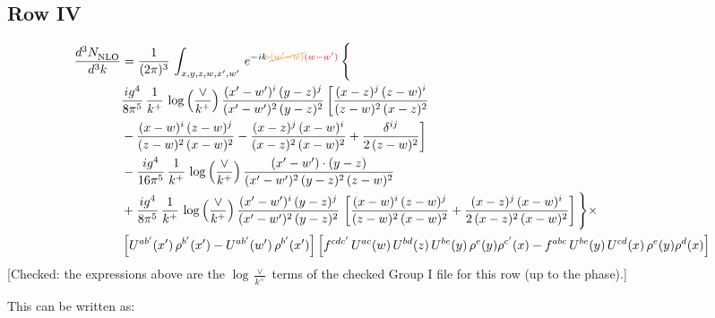 \documentclass[9pt]{article}
\numberwithin{equation}{section}
\begin{document}
\subsection{Row IV}
\begin{align}
    \frac{d^{3}N_{\rm NLO}^{\rm}}{d^{3}k}  & =   \frac{1}{(2\pi)^{3}}\,
    \int_{x,y,z,w,x',w'}\,e^{-ik\cdot {\color{orange}\cancel{(w^\prime-w)}}{\color{red}(w-w^\prime)}}\,\Bigg\{\notag \\
& \frac{ig^{4}}{8\pi^{5}}\,\frac{1}{k^{+}}\,\log{\left(\frac{\vee}{k^{+}}\right)}\,\frac{(x'-w')^{i}\,(y-z)^{j}}{(x'-w')^{2}\,(y-z)^{2}}\,\bigg[\frac{(x-z)^{j}\,(z-w)^{i}}{(z-w)^{2}\,(x-z)^{2}}\notag \\ & -\frac{(x-w)^{i}\,(z-w)^{j}}{(z-w)^{2}\,(x-w)^{2}}-\frac{(x-z)^{j}\,(x-w)^{i}}{(x-z)^{2}\,(x-w)^{2}}+\frac{\delta^{ij}}{2\,(z-w)^{2}}\bigg] \notag \\
& -\frac{ig^{4}}{16\pi^{5}}\,\frac{1}{k^{+}}\,\log{\left(\frac{\vee}{k^{+}}\right)} \,\frac{(x'-w')\cdot (y-z)}{(x'-w')^{2}\,(y-z)^{2}\,(z-w)^{2}}\notag \\
& + \frac{ig^{4}}{8\pi^{5}}\,\frac{1}{k^{+}}\,\log{\left(\frac{\vee}{k^{+}}\right)}\,\frac{(x'-w')^{i}\,(y-z)^{j}}{(x'-w')^{2}\,(y-z)^{2}}\,\left[\frac{(x-w)^{i}\,(z-w)^{j}}{(z-w)^{2}\,(x-w)^{2}}+\frac{(x-z)^{j}\,(x-w)^{i}}{2\, (x-z)^{2}\,(x-w)^{2}}\right]\Bigg\}\times\notag \\ &  \left[U^{ab'}(x')\,\rho^{b'}(x')-U^{ab'}(w')\,\rho^{b'}(x')\right] \left[f^{cdc'}\,U^{ac}(w)\,U^{bd}(z)\,U^{be}(y)\,\rho^{e}(y)\rho^{c'}(x)-f^{abc}\,U^{be}(y)\,U^{cd}(x)\,\rho^{e}(y)\rho^{d}(x)\right]
\end{align} {\color{red}[Checked: the expressions above are the $\log\frac{\vee}{k^{+}}$ terms of the checked Group I file for this row (up to the phase).]}\par\noindent 
This can be written as:
\end{document}
